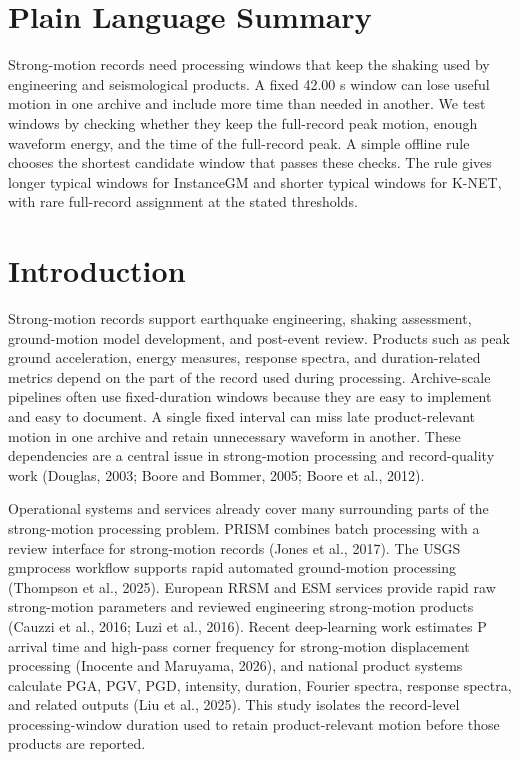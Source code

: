 \documentclass[12pt,letterpaper]{article}
\begin{document}
\section{Plain Language Summary}\label{plain-language-summary}

Strong-motion records need processing windows that keep the shaking used by engineering and seismological products. A fixed 42.00 s window can lose useful motion in one archive and include more time than needed in another. We test windows by checking whether they keep the full-record peak motion, enough waveform energy, and the time of the full-record peak. A simple offline rule chooses the shortest candidate window that passes these checks. The rule gives longer typical windows for InstanceGM and shorter typical windows for K-NET, with rare full-record assignment at the stated thresholds.

\section{Introduction}\label{introduction}

Strong-motion records support earthquake engineering, shaking assessment, ground-motion model development, and post-event review. Products such as peak ground acceleration, energy measures, response spectra, and duration-related metrics depend on the part of the record used during processing. Archive-scale pipelines often use fixed-duration windows because they are easy to implement and easy to document. A single fixed interval can miss late product-relevant motion in one archive and retain unnecessary waveform in another. These dependencies are a central issue in strong-motion processing and record-quality work (Douglas, 2003; Boore and Bommer, 2005; Boore et al., 2012).

Operational systems and services already cover many surrounding parts of the strong-motion processing problem. PRISM combines batch processing with a review interface for strong-motion records (Jones et al., 2017). The USGS gmprocess workflow supports rapid automated ground-motion processing (Thompson et al., 2025). European RRSM and ESM services provide rapid raw strong-motion parameters and reviewed engineering strong-motion products (Cauzzi et al., 2016; Luzi et al., 2016). Recent deep-learning work estimates P arrival time and high-pass corner frequency for strong-motion displacement processing (Inocente and Maruyama, 2026), and national product systems calculate PGA, PGV, PGD, intensity, duration, Fourier spectra, response spectra, and related outputs (Liu et al., 2025). This study isolates the record-level processing-window duration used to retain product-relevant motion before those products are reported.
\end{document}
